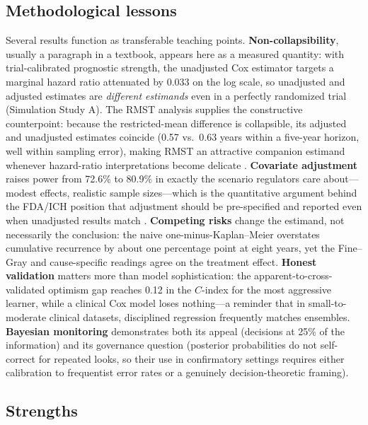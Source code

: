 \subsection{Methodological lessons}

Several results function as transferable teaching points.
\textbf{Non-collapsibility}, usually a paragraph in a textbook, appears
here as a measured quantity: with trial-calibrated prognostic strength,
the unadjusted Cox estimator targets a marginal hazard ratio attenuated
by $0.033$ on the log scale, so unadjusted and adjusted estimates are
\emph{different estimands} even in a perfectly randomized trial
(Simulation Study A). The RMST analysis supplies the constructive
counterpoint: because the restricted-mean difference is collapsible, its
adjusted and unadjusted estimates coincide (0.57 vs.\ 0.63 years within
a five-year horizon, well within sampling error), making RMST an
attractive companion estimand whenever hazard-ratio interpretations
become delicate \citep{royston2011,uno2014,martinussen2013}.
\textbf{Covariate adjustment} raises power from 72.6\% to 80.9\% in
exactly the scenario regulators care about---modest effects, realistic
sample sizes---which is the quantitative argument behind the FDA/ICH
position that adjustment should be pre-specified and reported even when
unadjusted results match \citep{fda2023,kahan2014}. \textbf{Competing
risks} change the estimand, not necessarily the conclusion: the naive
one-minus-Kaplan--Meier overstates cumulative recurrence by about one
percentage point at eight years, yet the Fine--Gray and cause-specific
readings agree on the treatment effect. \textbf{Honest validation}
matters more than model sophistication: the apparent-to-cross-validated
optimism gap reaches 0.12 in the $C$-index for the most aggressive
learner, while a clinical Cox model loses nothing---a reminder that in
small-to-moderate clinical datasets, disciplined regression frequently
matches ensembles. \textbf{Bayesian monitoring} demonstrates both its
appeal (decisions at 25\% of the information) and its governance
question (posterior probabilities do not self-correct for repeated
looks, so their use in confirmatory settings requires either
calibration to frequentist error rates or a genuinely decision-theoretic
framing).

\subsection{Strengths}

